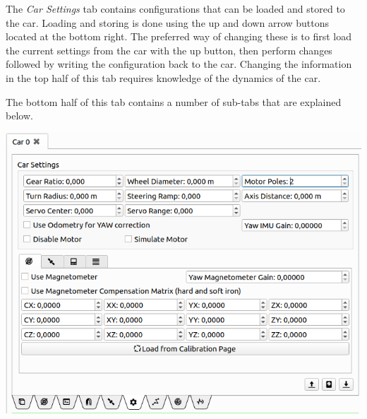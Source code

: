 \documentclass[12pt]{article} %
\begin{document}
\noindent\begin{minipage}{0.5\textwidth} %

 The {\em Car Settings} tab contains
configurations that can be loaded and stored to the car. Loading and
storing is done using the up and down arrow buttons located at the
bottom right. The preferred way of changing these is to first load the
current settings from the car with the up button, then perform changes
followed by writing the configuration back to the car. Changing the
information in the top half of this tab requires knowledge of the
dynamics of the car.

The bottom half of this tab contains a number of sub-tabs that are
explained below.
\end{minipage}
\begin{minipage}{0.5\textwidth}
  \noindent \includegraphics[width=\textwidth]{./screens/Car_configuration.png}
\end{minipage}
\end{document}
